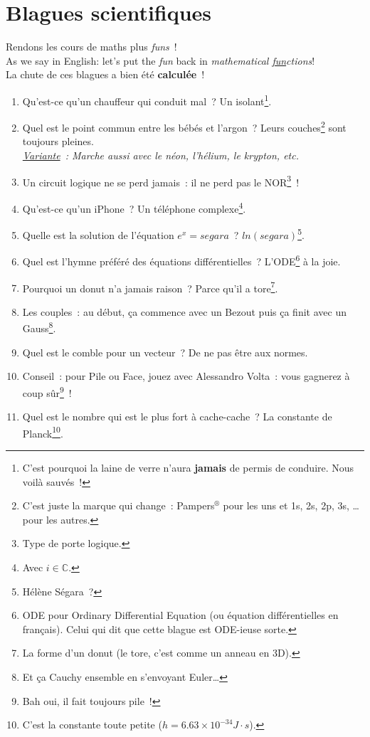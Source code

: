\documentclass[10pt,a5paper,fullpage]{book}
\begin{document}
	\chapter{Blagues scientifiques}
	Rendons les cours de maths plus \textit{funs}~! 
	\\As we say in English: let's put the \textit{fun} back in \textit{mathematical \underline{fun}ctions}!  
	\\La chute de ces blagues a bien été \textbf{calculée}~!  
	\newpage
	\begin{enumerate}
		\item Qu’est-ce qu’un chauffeur qui conduit mal~? Un isolant\footnote{C’est pourquoi la laine de verre n’aura \textbf{jamais} de permis de conduire. Nous voilà sauvés~!}.
		\item Quel est le point commun entre les bébés et l’argon~? Leurs couches\footnote{C'est juste la marque qui change~: Pampers$ ^{\circledR}$ pour les uns et 1s, 2s, 2p, 3s, \ldots pour les autres.} sont toujours pleines.	
		\\\textit{\underline{Variante}~: Marche aussi avec le néon, l’hélium, le krypton, etc.}
		\item Un circuit logique ne se perd jamais~: il ne perd pas le NOR\footnote{Type de porte logique.}~!
		\item Qu’est-ce qu’un iPhone~? Un téléphone complexe\footnote{Avec $i \in \mathbb{C}$.}.
		\item Quelle est la solution de l’équation $e^x = segara$~? $ln(segara)$\footnote{Hélène Ségara~?}.
		\item Quel est l’hymne préféré des équations différentielles~? L’ODE\footnote{ODE pour Ordinary Differential Equation (ou équation différentielles en français). Celui qui dit que cette blague est ODE-ieuse sorte.} à la joie.
		\item Pourquoi un donut n’a jamais raison~? Parce qu’il a tore\footnote{La forme d’un donut (le tore, c’est comme un anneau en 3D).}.
		\item Les couples~: au début, ça commence avec un Bezout puis ça finit avec un Gauss\footnote{Et ça Cauchy ensemble en s’envoyant Euler\ldots}.
		\item Quel est le comble pour un vecteur~? De ne pas être aux normes. 
		\item Conseil~: pour Pile ou Face, jouez avec Alessandro Volta~: vous gagnerez à coup sûr\footnote{Bah oui, il fait toujours pile~!}~!
		\item Quel est le nombre qui est le plus fort à cache-cache~? La constante de Planck\footnote{C'est la constante toute petite ($h = 6.63 \times 10^{-34} J\cdot s$).}.

\end{enumerate}
\end{document}
